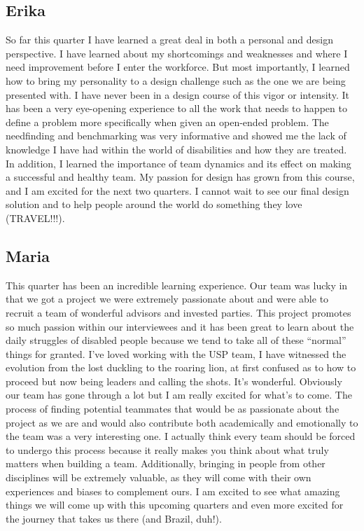 \documentclass[a4paper, 12pt,conference]{new_cit_thesis}
\begin{document}
\subsection{Erika}
So far this quarter I have learned a great deal in both a personal and design perspective.  I have learned about my shortcomings and weaknesses and where I need improvement before I enter the workforce.  But most importantly, I learned how to bring my personality to a design challenge such as the one we are being presented with.  I have never been in a design course of this vigor or intensity.  It has been a very eye-opening experience to all the work that needs to happen to define a problem more specifically when given an open-ended problem.  The needfinding and benchmarking was very informative and showed me the lack of knowledge I have had within the world of disabilities and how they are treated.  In addition, I learned the importance of team dynamics and its effect on making a successful and healthy team.  My passion for design has grown from this course, and I am excited for the next two quarters.  I cannot wait to see our final design solution and to help people around the world do something they love (TRAVEL!!!). 

\subsection{Maria}
This quarter has been an incredible learning experience. Our team was lucky in that we got a project we were extremely passionate about and were able to recruit a team of wonderful advisors and invested parties. This project promotes so much passion within our interviewees and it has been great to learn about the daily struggles of disabled people because we tend to take all of these “normal” things for granted. I’ve loved working with the USP team, I have witnessed the evolution from the lost duckling to the roaring lion, at first confused as to how to proceed but now being leaders and calling the shots. It’s wonderful. Obviously our team has gone through a lot but I am really excited for what’s to come. The process of finding potential teammates that would be as passionate about the project as we are and would also contribute both academically and emotionally to the team was a very interesting one. I actually think every team should be forced to undergo this process because it really makes you think about what truly matters when building a team. Additionally, bringing in people from other disciplines will be extremely valuable, as they will come with their own experiences and biases to complement ours. I am excited to see what amazing things we will come up with this upcoming quarters and even more excited for the journey that takes us there (and Brazil, duh!).
\end{document}
